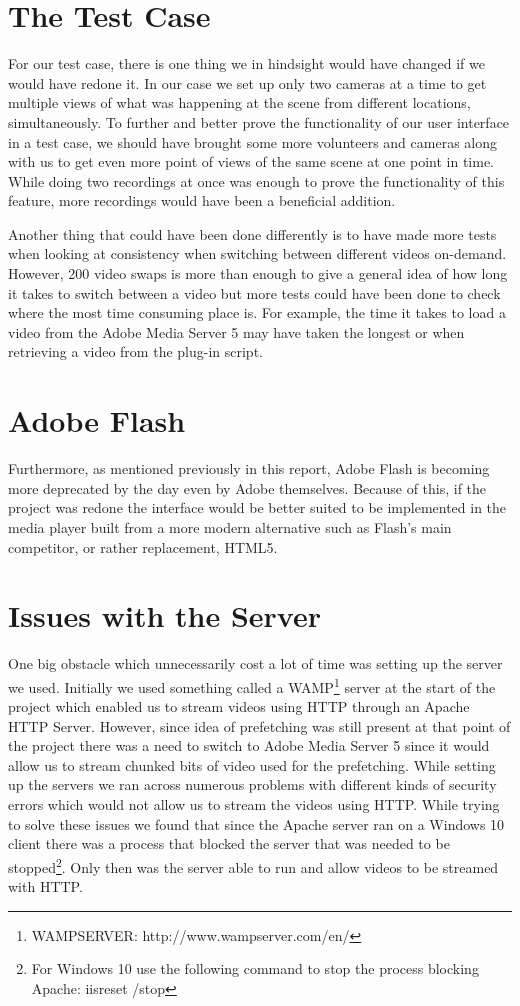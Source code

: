 \section{The Test Case}
\label{sec:test case} 
For our test case, there is one thing we in hindsight would have changed if we would have redone it. In our case we set up only two cameras at a time to get multiple views of what was happening at the scene from different locations, simultaneously. To further and better prove the functionality of our user interface in a test case, we should have brought some more volunteers and cameras along with us to get even more point of views of the same scene at one point in time. While doing two recordings at once was enough to prove the functionality of this feature, more recordings would have been a beneficial addition. 

Another thing that could have been done differently is to have made more tests when looking at consistency when switching between different videos on-demand. However, 200 video swaps is more than enough to give a general idea of how long it takes to switch between a video but more tests could have been done to check where the most time consuming place is. For example, the time it takes to load a video from the Adobe Media Server 5 may have taken the longest or when retrieving a video from the plug-in script.

\section{Adobe Flash}
\label{sec:adobe flash}

Furthermore, as mentioned previously in this report, Adobe Flash is becoming more deprecated by the day even by Adobe themselves. Because of this, if the project was redone the interface would be better suited to be implemented in the media player built from a more modern alternative such as Flash's main competitor, or rather replacement, HTML5.

\section{Issues with the Server}
\label{sec:serverissues}

One big obstacle which unnecessarily cost a lot of time was setting up the server we used. Initially we used something called a WAMP\footnote{WAMPSERVER: http://www.wampserver.com/en/} server at the start of the project which enabled us to stream videos using HTTP through an Apache HTTP Server. However, since idea of prefetching was still present at that point of the project there was a need to switch to Adobe Media Server 5 since it would allow us to stream chunked bits of video used for the prefetching. While setting up the servers we ran across numerous problems with different kinds of security errors which would not allow us to stream the videos using HTTP. While trying to solve these issues we found that since the Apache server ran on a Windows 10 client there was a process that blocked the server that was needed to be stopped\footnote{For Windows 10 use the following command to stop the process blocking Apache: iisreset /stop}. Only then was the server able to run and allow videos to be streamed with HTTP.

